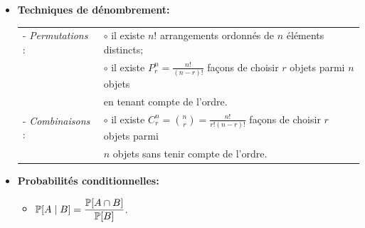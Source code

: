 \documentclass[12pt,french]{article}
\begin{document}
\begin{itemize}
\begin{itemize}
\item ${\mathbb P}[A] = 1 - {\mathbb P}[\overline{A}]$.

\item Si $A \subset B$, alors ${\mathbb P}[A] \le {\mathbb P}[B]$.

\item ${\mathbb P}[A \cup B] = {\mathbb P}[A] + {\mathbb P}[B]
- {\mathbb P}[A \cap B]$.

\item ${\mathbb P}[A\cup B\cup C]={\mathbb P}[A] + {\mathbb P}[B]
+ {\mathbb P}[C] - {\mathbb P}[A \cap B] - {\mathbb P}[B \cap C]
- {\mathbb P}[A \cap C]
+{\mathbb P}[A \cap B \cap C]$.

\item Dans le cas \'equiprobable (c'est-\`a-dire le cas o\`u ${\cal S}$ est
un ensemble fini et o\`u chaque \'el\'ement de ${\cal S}$ a la
m\^eme probabilit\'e de se r\'ealiser), on a ${\mathbb P}[A] =
\mbox{n($A$)}/\mbox{n(${\cal S}$)}$.

\end{itemize}

\item {\bf Techniques de d\'enombrement:}

\begin{tabular}{l l}
- {\it Permutations} :&$\circ$ il existe $n!$ arrangements ordonn\'es de $n$ \'el\'ements distincts;\\
                    & $\circ$ il existe $\displaystyle P_r^n = \frac{n!}{(n-r)!}$ fa\c cons de choisir
                    $r$ objets parmi $n$ objets \\
                    & en tenant compte de l'ordre. \\
-  {\it Combinaisons} :&$\circ$ il existe $\displaystyle C_r^n ={n \choose r} = \frac{n!}{r!(n-r)!}$ fa\c cons de choisir
                    $r$ objets parmi \\
                    &  $n$ objets sans tenir compte de l'ordre.
\end{tabular}

\newpage
\item {\bf Probabilit\'es conditionnelles:}

\begin{itemize}
\item
$
\begin{displaystyle}
{\mathbb P}[A\mid B] = \frac{{\mathbb P}[A \cap B]}{{\mathbb P}[B]}
\end{displaystyle}
$.



\end{itemize}
\end{itemize}
\end{document}
